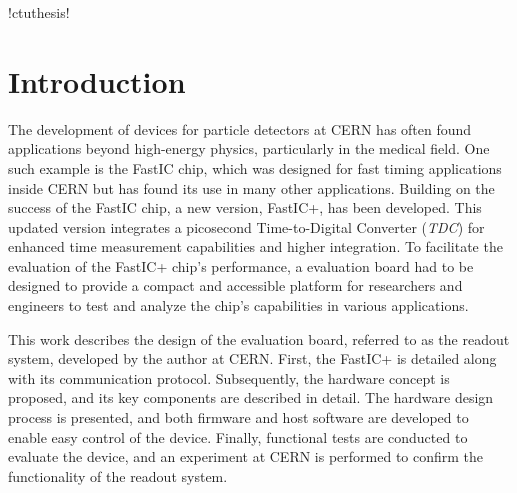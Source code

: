 \documentclass[twoside]{ctuthesis}
\theoremstyle{plain}
\theoremstyle{definition}
\theoremstyle{note}
\begin{document}
\renewcommand \ctulstsep {0pt}

\newcommand\ctuclsname{\leavevmode\unhcopy\ctuclsnamebox}
\newsavebox\ctuclsnamebox
\begin{lrbox}{\ctuclsnamebox}
\ctulst!ctuthesis!
\end{lrbox}

\maketitle


\newpage
\begingroup
\color{black}
\endgroup

\pagebreak

\chapter{Introduction}
The development of devices for particle detectors at CERN has often found applications beyond high-energy physics, particularly in the medical field. One such example is the FastIC chip, which was designed for fast timing applications inside CERN but has found its use in many other applications. Building on the success of the FastIC chip, a new version, FastIC+, has been developed. This updated version integrates a picosecond Time-to-Digital Converter (\emph{TDC}) for enhanced time measurement capabilities and higher integration. To facilitate the evaluation of the FastIC+ chip's performance, a evaluation board had to be designed to provide a compact and accessible platform for researchers and engineers to test and analyze the chip's capabilities in various applications.

This work describes the design of the evaluation board, referred to as the readout system, developed by the author at CERN. First, the FastIC+ is detailed along with its communication protocol. Subsequently, the hardware concept is proposed, and its key components are described in detail. The hardware design process is presented, and both firmware and host software are developed to enable easy control of the device. Finally, functional tests are conducted to evaluate the device, and an experiment at CERN is performed to confirm the functionality of the readout system.









\end{document}
